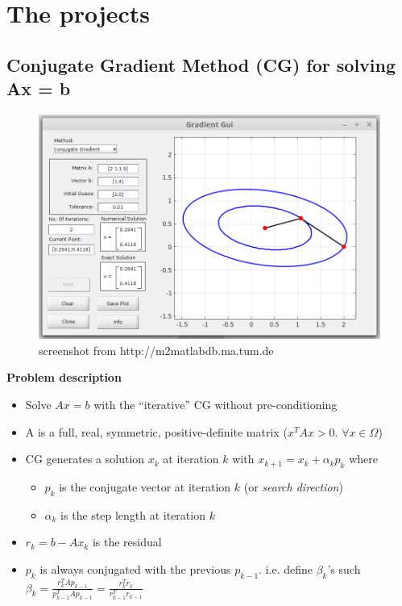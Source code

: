 \documentclass[10pt]{article}
\begin{document}
\section{The projects}

\subsection{Conjugate Gradient Method (CG) for solving Ax = b}

\begin{figure}[H]
\center

\includegraphics[width=118mm]{cg}
\caption{screenshot from http://m2matlabdb.ma.tum.de}
\end{figure}

\textbf{Problem description}
\\

\begin{itemize}
	\item{Solve $Ax = b$ with the ``iterative'' CG without pre-conditioning}
	\item{A is a full, real, symmetric, positive-definite matrix ($x^T A x > 0$. $\forall x \in \Omega$)}
	\item{CG generates a solution $x_k$ at iteration $k$ with $x_{k+1} = x_k + \alpha_k p_k$ where 
		\begin{itemize}
		\item{$p_k$ is the conjugate vector at iteration $k$ (or \textit{search direction})}
		\item{$\alpha_k$ is the step length at iteration $k$}
		\end{itemize}
	}
	\item{$r_k = b - A x_k$ is the residual}
	\item{$p_k$ is always conjugated with the previous $p_{k-1}$. i.e. define $\beta_k$'s such $\beta_k = \frac{r_k^T A p_{k-1}}{p_{k-1}^T A p_{k-1}} = \frac{r_k^T r_k}{r_{k-1}^T r_{k-1}}$}
\end{itemize}
\end{document}
